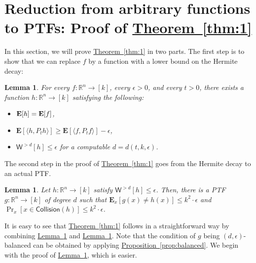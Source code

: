 \documentclass[11pt]{article}
\numberwithin{equation}{section}
\newtheorem{lemma}[theorem]{Lemma}
\theoremstyle{definition}
\theoremstyle{plain}
\newcommand{\expref}[2]{\hyperref[#2]{#1~\ref{#2}}}
\newcommand{\E}{{\bf E}}
\begin{document}
\section{Reduction from arbitrary functions to PTFs: Proof of \expref{Theorem}{thm:1}}\label{sec:reduction}
In this section, we will prove \expref{Theorem}{thm:1} in two parts.
The first step is to show that
we can replace $f$ by a function with a lower bound on the Hermite decay:
\begin{lemma}\label{lem:1} 
  For every $f: \mathbb{R}^n \rightarrow [k]$, every $\epsilon>0$, and every $t > 0$, there exists a function
 $h: \mathbb{R}^n \rightarrow [k]$ satisfying the following: 
 \begin{itemize}
   \item $\E[h] = \E[f]$,
 \item $\mathbf{E}[\langle h, P_t h \rangle] \ge\mathbf{E}[ \langle f, P_t f \rangle ]- \epsilon$, 
 \item $\mathsf{W}^{> d} [h] \le \epsilon$ for a computable $d = d(t, k, \epsilon)$. 
 \end{itemize}
\end{lemma} 
The second step in the proof of \expref{Theorem}{thm:1} goes from the
Hermite decay to an actual PTF. 
\begin{lemma}\label{lem:2}
Let $h : \mathbb{R}^n \rightarrow [k]$ satisfy $\mathsf{W}^{>d}[h] \le \epsilon$. Then, there is a PTF $g: \mathbb{R}^n \rightarrow [k]$ of degree $d$ such that 
$ \mathbf{E}_{x } [g(x) \neq  h(x) ] \le k^2 \cdot  \epsilon$ and $\Pr_{x } [x \in \mathsf{Collision} (h)]  \le k^2 \cdot \epsilon$.
\end{lemma}
It is easy to see that \expref{Theorem}{thm:1} follows in a straightforward way by combining \expref{Lemma}{lem:1} and \expref{Lemma}{lem:2}. 
Note that the condition of $g$ being $(d,\epsilon)$-balanced can be obtained by  applying \expref{Proposition}{prop:balanced}.
We begin with the proof of \expref{Lemma}{lem:2}, which is easier.
\end{document}
